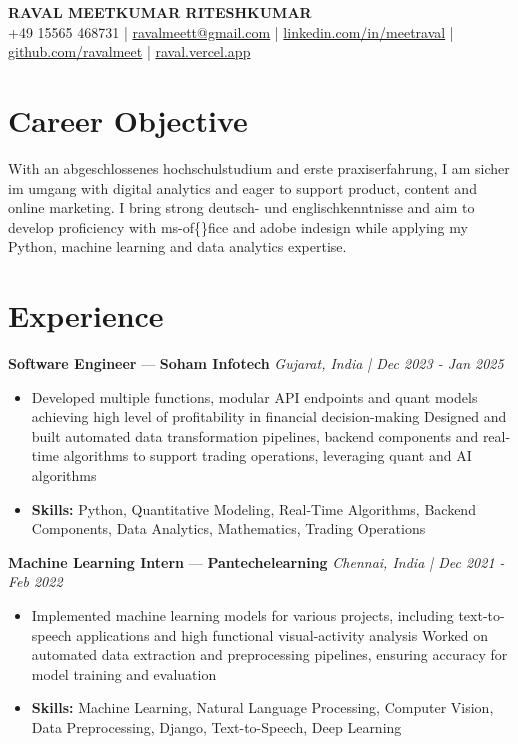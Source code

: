 \documentclass[a4paper,10pt]{article}
\begin{document}
\begin{center}
  {\Large\bfseries RAVAL MEETKUMAR RITESHKUMAR}\\[2pt]
  {\small +49 15565 468731 \;|\; \href{mailto:ravalmeett@gmail.com}{ravalmeett@gmail.com} \;|\; \href{https://www.linkedin.com/in/meetraval/}{linkedin.com/in/meetraval} \;|\; \href{https://github.com/ravalmeet}{github.com/ravalmeet} \;|\; \href{https://raval.vercel.app/}{raval.vercel.app}}
\end{center}
\vspace{-3pt}

\section*{Career Objective}
With an abgeschlossenes hochschulstudium and erste praxiserfahrung, I am sicher im umgang with digital analytics and eager to support product, content and online marketing. I bring strong deutsch- und englischkenntnisse and aim to develop proficiency with ms-of\{\}fice and adobe indesign while applying my Python, machine learning and data analytics expertise.\par

\section*{Experience}
\textbf{Software Engineer} — \textbf{Soham Infotech} \hfill \textit{Gujarat, India \;|\; Dec 2023 - Jan 2025}\par
\vspace{1pt}
\begin{itemize}
  \item Developed multiple functions, modular API endpoints and quant models achieving high level of profitability in financial decision-making Designed and built automated data transformation pipelines, backend components and real-time algorithms to support trading operations, leveraging quant and AI algorithms
  \item \textbf{Skills:} Python, Quantitative Modeling, Real-Time Algorithms, Backend Components, Data Analytics, Mathematics, Trading Operations
\end{itemize}
\vspace{3pt}
\textbf{Machine Learning Intern} — \textbf{Pantechelearning} \hfill \textit{Chennai, India \;|\; Dec 2021 - Feb 2022}\par
\vspace{1pt}
\begin{itemize}
  \item Implemented machine learning models for various projects, including text-to-speech applications and high functional visual-activity analysis Worked on automated data extraction and preprocessing pipelines, ensuring accuracy for model training and evaluation
  \item \textbf{Skills:} Machine Learning, Natural Language Processing, Computer Vision, Data Preprocessing, Django, Text-to-Speech, Deep Learning
\end{itemize}
\end{document}
